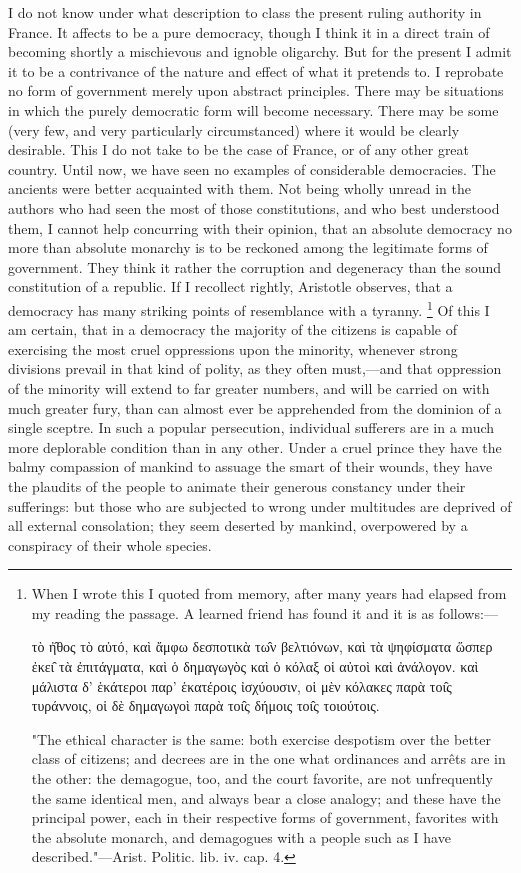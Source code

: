 I do not know under what description to class the present ruling authority in France. It affects to be a pure democracy, though I think it in a direct train of becoming shortly a mischievous and ignoble oligarchy. But for the present I admit it to be a contrivance of the nature and effect of what it pretends to. I reprobate no form of government merely upon abstract principles. There may be situations in which the purely democratic form will become necessary. There may be some (very few, and very particularly circumstanced) where it would be clearly desirable. This I do not take to be the case of France, or of any other great country. Until now, we have seen no examples of considerable democracies. The ancients were better acquainted with them. Not being wholly unread in the authors who had seen the most of those constitutions, and who best understood them, I cannot help concurring with their opinion, that an absolute democracy no more than absolute monarchy is to be reckoned among the legitimate forms of government. They think it rather the corruption and degeneracy than the sound constitution of a republic. If I recollect rightly, Aristotle observes, that a democracy has many striking points of resemblance with a tyranny.
\footnote{ When I wrote this I quoted from memory, after many years had elapsed from my reading the passage. A learned friend has found it and it is as follows:—

{\g τὸ ἠ̂θος τὸ αὐτό, καὶ ἄμφω δεσποτικὰ τω̂ν βελτιόνων, καὶ τὰ ψηφίσματα ὥσπερ ἐκει̂ τὰ ἐπιτάγματα, καὶ ὁ δημαγωγὸς καὶ ὁ κόλαξ οἱ αὐτοὶ καὶ ἀνάλογον. καὶ μάλιστα δ' ἑκάτεροι παρ' ἑκατέροις ἰσχύουσιν, οἱ μὲν κόλακες παρὰ τοι̂ς τυράννοις, οἱ δὲ δημαγωγοὶ παρὰ τοι̂ς δήμοις τοι̂ς τοιούτοις.}

"The ethical character is the same: both exercise despotism over the better class of citizens; and decrees are in the one what ordinances and arrêts are in the other: the demagogue, too, and the court favorite, are not unfrequently the same identical men, and always bear a close analogy; and these have the principal power, each in their respective forms of government, favorites with the absolute monarch, and demagogues with a people such as I have described."—Arist. Politic. lib. iv. cap. 4.
}
 Of this I am certain, that in a democracy the majority of the citizens is capable of exercising the most cruel oppressions upon the minority, whenever strong divisions prevail in that kind of polity, as they often must,—and that oppression of the minority will extend to far greater numbers, and will be carried on with much greater fury, than can almost ever be apprehended from the dominion of a single sceptre. In such a popular persecution, individual sufferers are in a much more deplorable condition than in any other. Under a cruel prince they have the balmy compassion of mankind to assuage the smart of their wounds, they have the plaudits of the people to animate their generous constancy under their sufferings: but those who are subjected to wrong under multitudes are deprived of all external consolation; they seem deserted by mankind, overpowered by a conspiracy of their whole species.

